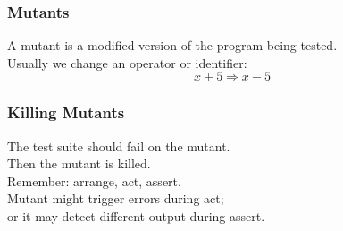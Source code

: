 \documentclass{beamer}
\newenvironment{changemargin}[1]{%
  \begin{list}{}{%
    \setlength{\topsep}{0pt}%
    \setlength{\leftmargin}{#1}%
    \setlength{\rightmargin}{1em}
    \setlength{\listparindent}{\parindent}%
    \setlength{\itemindent}{\parindent}%
    \setlength{\parsep}{\parskip}%
  }%
  \item[]}{\end{list}}
\begin{document}
\begin{frame}
  \frametitle{Mutants}
  \Large
  \begin{changemargin}{2em}
    A \alert{mutant} is a modified version of the program being tested.\\[1em]
    Usually we change an operator or identifier:
    \[ x + 5 \Rightarrow x - 5 \]
    
  \end{changemargin}
\end{frame}

\usebackgroundtemplate{}
\begin{frame}
  \frametitle{Killing Mutants}
  \Large
  \begin{changemargin}{2em}
    The test suite should fail on the mutant. \\
    Then the mutant is \alert{killed}.\\[1em]

    Remember: arrange, act, assert.\\
    Mutant might trigger errors during act;\\
    or it may detect different output during assert.
  \end{changemargin}
\end{frame}
\end{document}
